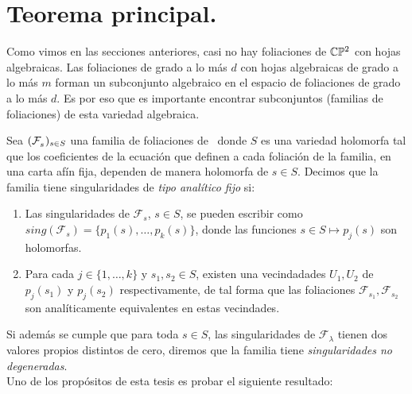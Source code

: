\section{Teorema principal.}

Como vimos en las secciones anteriores, casi no hay foliaciones de $\mathbb{C}\mathbb{P}^2$ con hojas algebraicas. Las foliaciones de grado a lo más $d$ con hojas algebraicas de grado a lo más $m$ forman un subconjunto algebraico en el espacio de foliaciones de grado a lo más $d$. Es por eso que es importante encontrar subconjuntos (familias de foliaciones) de esta variedad algebraica.
\begin{defn}
\label{Def:TipoAnFijo}
Sea $(\mathcal{F}^{\ }_{s})_{s\in S}$ una familia de foliaciones de \CP\, donde $S$ es una variedad holomorfa tal que los coeficientes de la ecuación que definen a cada foliación de la familia, en una carta afín fija, dependen de manera holomorfa de $s\in S$. Decimos que la familia tiene singularidades de \emph{tipo analítico fijo} si:

\begin{enumerate}

\item Las singularidades de $\mathcal{F}_s$, $s\in S$, se pueden escribir como $\mathit{sing}(\mathcal{F}_s) = \{p_1(s),\ldots,p_k(s) \}$, donde las funciones $s\in S\mapsto p_j(s)$ son holomorfas.

\item Para cada $j\in\{1,\ldots,k\}$ y $s_1,s_2\in S$, existen una vecindadades $U_1,U_2$ de $p_j(s_1)$ y $p_j(s_2)$ respectivamente, de tal forma que las foliaciones $\mathcal{F}_{s_1},\mathcal{F}_{s_2}$  son analíticamente equivalentes en estas vecindades.
\end{enumerate}
\end{defn}

Si además se cumple que para toda $s\in S$, las singularidades de $\mathcal{F}_\lambda$ tienen dos valores propios distintos de cero, diremos que la familia tiene \emph{singularidades no degeneradas}.
\\

Uno de los propósitos de esta tesis es probar el siguiente resultado:

